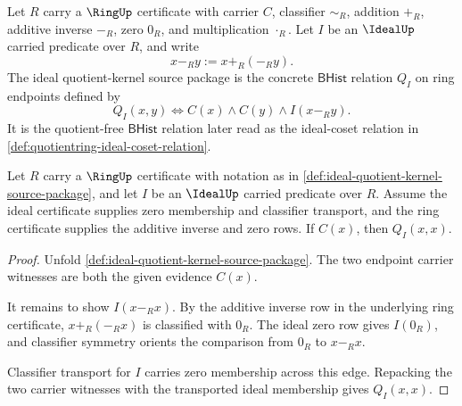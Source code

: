 \begin{definition}
\label{def:ideal-quotient-kernel-source-package}
Let $R$ carry a $\RingUp$ certificate with carrier $C$, classifier $\sim_R$, addition $+_R$, additive inverse $-_R$, zero $0_R$, and multiplication $\cdot_R$. Let $I$ be an $\IdealUp$ carried predicate over $R$, and write
$$
x-_R y:=x+_R(-_R y).
$$
The ideal quotient-kernel source package is the concrete $\mathsf{BHist}$ relation $Q_I$ on ring endpoints defined by
$$
Q_I(x,y)\Longleftrightarrow C(x)\land C(y)\land I(x-_R y).
$$
It is the quotient-free $\mathsf{BHist}$ relation later read as the ideal-coset relation in \autoref{def:quotientring-ideal-coset-relation}.
\end{definition}

\begin{theorem}
\label{thm:ideal-quotient-kernel-diagonal-exactness}
Let $R$ carry a $\RingUp$ certificate with notation as in \autoref{def:ideal-quotient-kernel-source-package}, and let $I$ be an $\IdealUp$ carried predicate over $R$. Assume the ideal certificate supplies zero membership and classifier transport, and the ring certificate supplies the additive inverse and zero rows. If $C(x)$, then $Q_I(x,x)$.
\end{theorem}
\begin{proof}
Unfold \autoref{def:ideal-quotient-kernel-source-package}. The two endpoint carrier witnesses are both the given evidence $C(x)$.

It remains to show $I(x-_R x)$. By the additive inverse row in the underlying ring certificate, $x+_R(-_R x)$ is classified with $0_R$. The ideal zero row gives $I(0_R)$, and classifier symmetry orients the comparison from $0_R$ to $x-_R x$.

Classifier transport for $I$ carries zero membership across this edge. Repacking the two carrier witnesses with the transported ideal membership gives $Q_I(x,x)$.
\end{proof}

